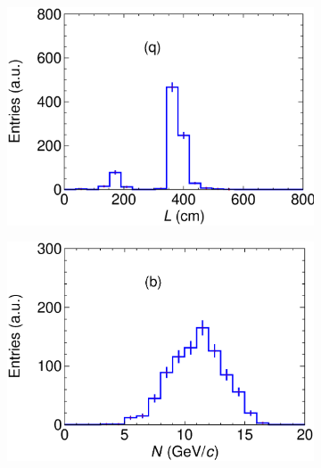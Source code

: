 \begin{figure}[t]
     \centering
     \begin{subfigure}[b]{0.48\textwidth}
         \centering
         \includegraphics[width=\textwidth]{figures/ch4-KF_NDGArLite/Toy/LengthAllTall.eps}
         \caption{}
         \label{fig:ToyGArLite_L}
     \end{subfigure}
     \begin{subfigure}[b]{0.48\textwidth}
         \centering
         \includegraphics[width=\textwidth]{figures/ch4-KF_NDGArLite/Toy/NPointsAllTall.eps}
         \caption{}
         \label{fig:ToyGArLite_N}
     \end{subfigure}
          \begin{subfigure}[b]{0.48\textwidth}
         \centering

\end{subfigure}
\end{figure}
